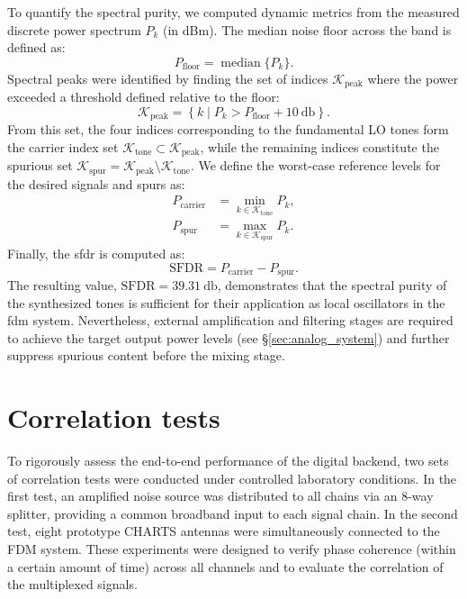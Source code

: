 To quantify the spectral purity, we computed dynamic metrics from the measured discrete power spectrum $P_k$ (in dBm). The median noise floor across the band is defined as:
\begin{equation}
	P_{\mathrm{floor}} = \operatorname{median}\{P_k\}.
\end{equation}
Spectral peaks were identified by finding the set of indices $\mathcal{K}_{\mathrm{peak}}$ where the power exceeded a threshold defined relative to the floor:
\begin{equation}
	\mathcal{K}_{\mathrm{peak}} = \left\{ k \mid P_k > P_{\mathrm{floor}} + \SI{10}{\decibel} \right\}.
\end{equation}
From this set, the four indices corresponding to the fundamental LO tones form the carrier index set $\mathcal{K}_{\mathrm{tone}} \subset \mathcal{K}_{\mathrm{peak}}$, while the remaining indices constitute the spurious set $\mathcal{K}_{\mathrm{spur}} = \mathcal{K}_{\mathrm{peak}} \setminus \mathcal{K}_{\mathrm{tone}}$. We define the worst-case reference levels for the desired signals and spurs as:
\begin{align}
	P_{\mathrm{carrier}} &= \min_{k \in \mathcal{K}_{\mathrm{tone}}} P_k, \\
	P_{\mathrm{spur}} &= \max_{k \in \mathcal{K}_{\mathrm{spur}}} P_k.
\end{align}
Finally, the \gls{sfdr} is computed as:
\begin{equation}
	\mathrm{SFDR} = P_{\mathrm{carrier}} - P_{\mathrm{spur}}.
\end{equation}
The resulting value, $\mathrm{SFDR} = \SI{39.31}{\decibel}$, demonstrates that the spectral purity of the synthesized tones is sufficient for their application as local oscillators in the \gls{fdm} system. Nevertheless, external amplification and filtering stages are required to achieve the target output power levels (see \S\ref{sec:analog_system}) and further suppress spurious content before the mixing stage.

\section{Correlation tests}
To rigorously assess the end-to-end performance of the digital backend, two sets of correlation tests were conducted under controlled laboratory conditions. In the first test, an amplified noise source was distributed to all chains via an 8-way splitter, providing a common broadband input to each signal chain. In the second test, eight prototype CHARTS antennas were simultaneously connected to the FDM system. These experiments were designed to verify phase coherence (within a certain amount of time) across all channels and to evaluate the correlation of the multiplexed signals.

